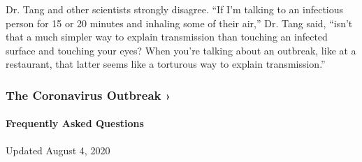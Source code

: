 Dr. Tang and other scientists strongly disagree. ``If I'm talking to an
infectious person for 15 or 20 minutes and inhaling some of their air,''
Dr. Tang said, ``isn't that a much simpler way to explain transmission
than touching an infected surface and touching your eyes? When you're
talking about an outbreak, like at a restaurant, that latter seems like
a torturous way to explain transmission.''

\href{https://www.nytimes3xbfgragh.onion/news-event/coronavirus?action=click\&pgtype=Article\&state=default\&region=MAIN_CONTENT_3\&context=storylines_faq}{}

\hypertarget{the-coronavirus-outbreak-}{%
\subsubsection{The Coronavirus Outbreak
›}\label{the-coronavirus-outbreak-}}

\hypertarget{frequently-asked-questions}{%
\paragraph{Frequently Asked
Questions}\label{frequently-asked-questions}}

Updated August 4, 2020

